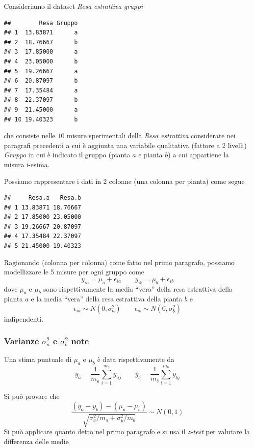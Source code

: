 \documentclass[
  11pt,
]{book}
\begin{document}
Consideriamo il dataset \emph{Resa estrattiva gruppi}

\begin{verbatim}
##        Resa Gruppo
## 1  13.83871      a
## 2  18.76667      b
## 3  17.85000      a
## 4  23.05000      b
## 5  19.26667      a
## 6  20.87097      b
## 7  17.35484      a
## 8  22.37097      b
## 9  21.45000      a
## 10 19.40323      b
\end{verbatim}

che consiste nelle \(10\) misure sperimentali della \emph{Resa estrattiva} considerate nei
paragrafi precedenti a cui è aggiunta una variabile qualitativa (fattore a 2 livelli) \emph{Gruppo} in cui è
indicato il gruppo (pianta \(a\) e pianta \(b\)) a cui appartiene la misura i-esima.

Possiamo rappresentare i dati in 2 colonne (una colonna per pianta) come segue

\begin{verbatim}
##     Resa.a   Resa.b
## 1 13.83871 18.76667
## 2 17.85000 23.05000
## 3 19.26667 20.87097
## 4 17.35484 22.37097
## 5 21.45000 19.40323
\end{verbatim}

Ragionando (colonna per colonna) come fatto nel primo paragrafo, possiamo modellizzare le 5 misure per ogni gruppo come
\[
y_{ia}=\mu_a+\epsilon_{ia} \qquad y_{i5}=\mu_b+\epsilon_{ib}
\]
dove \(\mu_a\) e \(\mu_b\) sono rispettivamente la media ``vera'' della resa estrattiva della pianta \(a\) e la media ``vera'' della resa estrattiva della pianta \(b\) e
\[
\epsilon_{ia}\sim N(0,\sigma_a^2) \qquad  \epsilon_{ib}\sim N(0,\sigma_b^2)
\]
indipendenti.

\hypertarget{varianze-sigma2_a-e-sigma2_b-note}{%
\subsubsection{\texorpdfstring{Varianze \(\sigma^2_a\) e \(\sigma^2_b\) note}{Varianze \textbackslash sigma\^{}2\_a e \textbackslash sigma\^{}2\_b note}}\label{varianze-sigma2_a-e-sigma2_b-note}}

Una stima puntuale di \(\mu_a\) e \(\mu_b\) è data rispettivamente da
\[
\bar y_a = \frac{1}{m_a}\sum_{i=1}^{m_a} y_{aj} \qquad 
\bar y_b = \frac{1}{m_b}\sum_{i=1}^{m_b} y_{bj}
\]

Si può provare che
\[
\frac{(\bar y_a - \bar y_b)-(\mu_a-\mu_b)}{\sqrt{\sigma^2_a/m_a+\sigma^2_b/m_b}} \sim N(0,1)
\]
Si può applicare quanto detto nel primo paragrafo e si usa il \emph{z-test} per valutare la differenza delle medie
\end{document}
